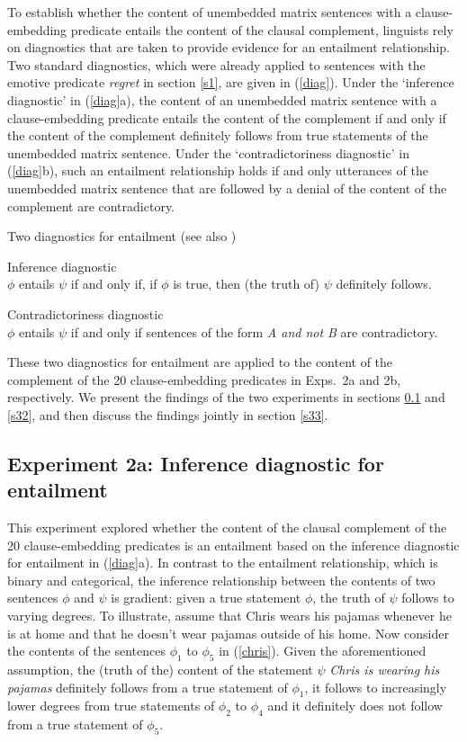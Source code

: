 \documentclass[11pt,fleqn]{article}
\newcommand{\6}{\mbox{$[\hspace*{-.6mm}[$}}
\newcommand{\9}{\mbox{$]\hspace*{-.6mm}]$}}
\begin{document}
To establish whether the content of unembedded matrix sentences with a clause-embedding predicate entails the content of the clausal complement, linguists rely on diagnostics that are taken to provide evidence for an entailment relationship. Two standard diagnostics, which were already applied to sentences with the emotive predicate {\em regret} in section \ref{s1}, are given in (\ref{diag}). Under the `inference diagnostic' in (\ref{diag}a), the content of an unembedded matrix sentence with a clause-embedding predicate entails the content of the complement if and only if the content of the complement definitely follows from true statements of the unembedded matrix sentence. Under the `contradictoriness diagnostic' in (\ref{diag}b), such an entailment relationship holds if and only utterances of the unembedded matrix sentence that are followed by a denial of the content of the complement are contradictory. 

\begin{exe}
\ex\label{diag} Two diagnostics for entailment \hfill (see also \citealt[\S3.1]{ccmg90})
\begin{xlist}
\ex  Inference diagnostic \\ $\phi$ entails $\psi$ if and only if, if $\phi$ is true, then (the truth of) $\psi$ definitely follows. 

\ex  Contradictoriness diagnostic \\ $\phi$ entails $\psi$ if and only if sentences of the form {\em A and not B} are contradictory. 

\end{xlist}
\end{exe}
These two diagnostics for entailment are applied to the content of the complement of the 20 clause-embedding predicates in Exps.~2a and 2b, respectively. We present the findings of the two experiments in sections \ref{s31} and \ref{s32}, and then discuss the findings jointly in section \ref{s33}.

\subsection{Experiment 2a: Inference diagnostic for entailment}\label{s31}

This experiment explored whether the content of the clausal complement of the 20 clause-embedding predicates is an entailment based on the inference diagnostic for entailment in (\ref{diag}a). In contrast to the entailment relationship, which is binary and categorical, the inference relationship between the contents of two sentences $\phi$ and $\psi$ is gradient: given a true statement $\phi$, the truth of $\psi$ follows to varying degrees. To illustrate, assume that Chris wears his pajamas whenever he is at home and that he doesn't wear pajamas outside of his home. Now consider the contents of the sentences $\phi_1$ to $\phi_5$ in (\ref{chris}). Given the aforementioned assumption, the (truth of the) content of the statement $\psi$ {\em Chris is wearing his pajamas} definitely follows from a true statement of $\phi_1$, it follows to increasingly lower degrees from true statements of $\phi_2$ to $\phi_4$ and it definitely does not follow from a true statement of $\phi_5$. 
\end{document}
